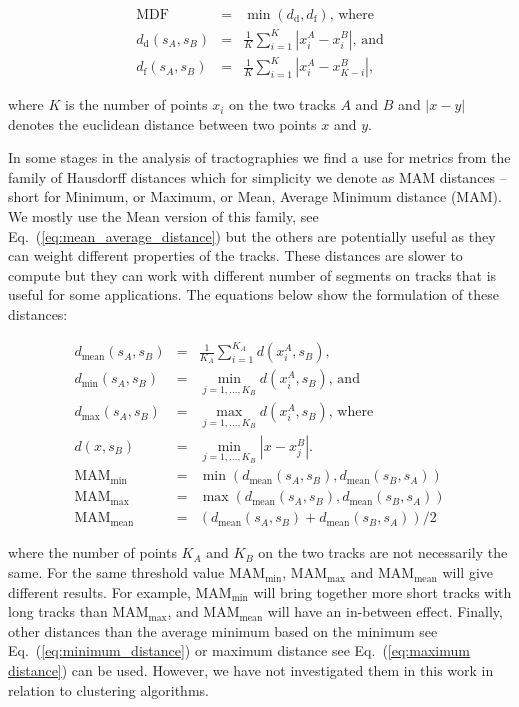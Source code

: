 \documentclass[preprint,authoryear,a4paper,10pt,onecolumn]{elsarticle}
\begin{document}
\begin{eqnarray}
\textrm{MDF} & = & \min(d_{\textrm{d}},d_{\textrm{f}}),\,\textrm{where}\nonumber\\
d_{\textrm{d}}(s_{A},s_{B}) & = & \frac{1}{K}\sum_{i=1}^{K}|x_{i}^{A}-x_{i}^{B}|,\,\textrm{and}\label{eq:direct_flip_distance} \\
d_{\textrm{f}}(s_{A},s_{B}) & = & \frac{1}{K}\sum_{i=1}^{K}|x_{i}^{A}-x_{K-i}^{B}|,\nonumber
\end{eqnarray}

\noindent
where $K$ is the number of points $x_{i}$ on the two tracks $A$ and $B$
and $|x-y|$ denotes the euclidean distance between two points $x$ and
$y$.

In some stages in the analysis of tractographies we find a use for metrics from the family of Hausdorff distances
which for simplicity we denote as MAM distances -- short for Minimum,
or Maximum, or Mean, Average Minimum distance (MAM). We mostly use
the Mean version of this family, see Eq.~(\ref{eq:mean_average_distance})
but the others are potentially useful as they can weight different
properties of the tracks. These distances are slower to compute but
they can work with different number of segments on tracks that is
useful for some applications. The equations below show the formulation
of these distances:

\begin{eqnarray}
d_{\textrm{mean}}(s_{A},s_{B}) & = & \frac{1}{K_{A}}\sum_{i=1}^{K_{A}}d(x_{i}^{A},s_{B}),\nonumber \\
d_{\textrm{min}}(s_{A},s_{B}) & = & \min_{j=1,...,K_{B}}d(x_{i}^{A},s_{B}),\,\textrm{and}\label{eq:minimum_distance}\\
d_{\textrm{max}}(s_{A},s_{B}) & = & \max_{j=1,...,K_{B}}d(x_{i}^{A},s_{B}),\,\textrm{where}\label{eq:maximum distance}\\
d(x,s_{B}) & = & \min_{j=1,...,K_{B}}|x-x_{j}^{B}|.\nonumber \\
\textrm{MAM}_{\textrm{min}} & = & \min(d_{\textrm{mean}}(s_{A},s_{B}),d_{\textrm{mean}}(s_{B},s_{A}))\label{eq:min_average_distance}\\
\textrm{MAM}_{\textrm{max}} & = & \max(d_{\textrm{mean}}(s_{A},s_{B}),d_{\textrm{mean}}(s_{B},s_{A}))\nonumber \\
\textrm{MAM}_{\textrm{mean}} & = & (d_{\textrm{mean}}(s_{A},s_{B})+d_{\textrm{mean}}(s_{B},s_{A}))/2\label{eq:mean_average_distance}\end{eqnarray}


\noindent
where the number of points $K_{A}$ and $K_{B}$ on the two tracks
are not necessarily the same. For the same threshold value $\textrm{MAM}_{\textrm{min}}$,
$\textrm{MAM}_{\textrm{max}}$ and $\textrm{MAM}_{\textrm{mean}}$
will give different results. For example, $\textrm{MAM}_{\textrm{min}}$ will
bring together more short tracks with long tracks than $\textrm{MAM}_{\textrm{max}}$,
and 
$\textrm{MAM}_{\textrm{mean}}$ 
will have an in-between effect. Finally, other distances than the average
minimum based on the minimum see Eq.~(\ref{eq:minimum_distance})
or maximum distance see Eq.~(\ref{eq:maximum distance}) can be used.
However, we have not investigated them in this work in relation to
clustering algorithms.
\end{document}
